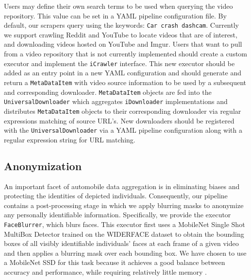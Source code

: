 \documentclass[letterpaper, 10 pt, conference]{IEEEconf}
\newcommand{\todo}[1]{{\color{red}#1}}
\begin{document}
Users may define their own search terms to be used when querying the video repository. This value can be set in a YAML pipeline configuration file. By default, our scrapers query using the keywords: \texttt{Car crash dashcam}. Currently we support crawling Reddit and YouTube to locate videos that are of interest, and downloading videos hosted on YouTube and Imgur. Users that want to pull from a video repository that is not currently implemented should create a custom executor and implement the \texttt{iCrawler} interface. This new executor should be added as an entry point in a new YAML configuration and should generate and return a \texttt{MetaDataItem} with video source information to be used by a subsequent and corresponding downloader. \texttt{MetaDataItem} objects are fed into the \texttt{UniversalDownloader} which aggregates \texttt{iDownloader} implementations and distributes \texttt{MetaDataItem} objects to their corresponding downloader via regular expressions matching of source URL's. New downloaders should be registered with the \texttt{UniversalDownloader} via a YAML pipeline configuration along with a regular expression string for URL matching.

\subsection{Anonymization}
An important facet of automobile data aggregation is in eliminating biases and protecting the identities of depicted individuals. Consequently, our pipeline contains a post-processing stage in which we apply blurring masks to anonymize any personally identifiable information. Specifically, we provide the executor \texttt{FaceBlurrer}, which blurs faces. This executor first uses a MobileNet Single Shot MultiBox Detector \cite{yixuan_h_y_hu_2021_4642275} trained on the WIDERFACE dataset \cite{yang2016wider} to obtain the bounding boxes of all visibly identifiable individuals' faces at each frame of a given video and then applies a blurring mask over each bounding box. We have chosen to use a MobileNet SSD for this task because it achieves a good balance between accuracy and performance, while requiring relatively little memory \cite{yixuan_h_y_hu_2021_4642275}.
\end{document}
